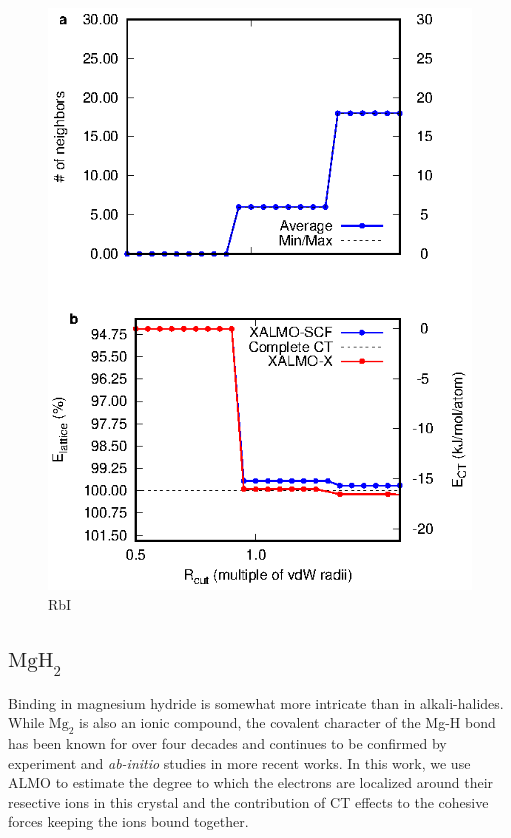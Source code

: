 \documentclass[aps,prb,twocolumn,amsmath,amssymb,superscriptaddress,longbibliography]{revtex4-1}
\begin{document}
\begin{figure}
\includegraphics[scale=1]{./plots/RbI_EvR}
\caption{RbI}
\label{rbi}
\end{figure}






\subsection*{ $\text{MgH}_{2}$ }

Binding in magnesium hydride is somewhat more intricate than in alkali-halides. While $\text{Mg}_{2}$ is also an ionic compound, the covalent character of the Mg-H bond has been known for over four decades and continues to be confirmed by experiment and \emph{ab-initio} studies in more recent works.
In this work, we use ALMO to estimate the degree to which the electrons are localized around their resective ions in this crystal and the contribution of CT effects to the cohesive forces keeping the ions bound together.    
\end{document}
